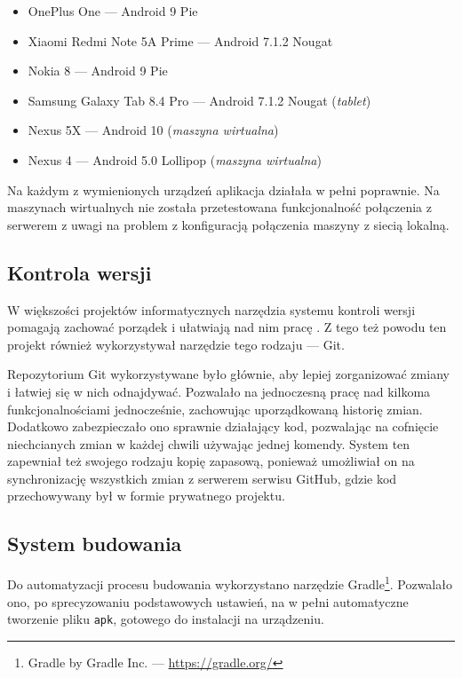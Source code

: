 \documentclass[polish,polish,a4paper,12pt]{article}
\begin{document}
	\begin{itemize}
		\item OnePlus One — Android 9 Pie
		\item Xiaomi Redmi Note 5A Prime — Android 7.1.2 Nougat
		\item Nokia 8 — Android 9 Pie
		\item Samsung Galaxy Tab 8.4 Pro — Android 7.1.2 Nougat (\textit{tablet})
		\item Nexus 5X — Android 10 (\textit{maszyna wirtualna})
		\item Nexus 4 — Android 5.0 Lollipop (\textit{maszyna wirtualna})
	\end{itemize}

	Na każdym z wymienionych urządzeń aplikacja działała w pełni poprawnie. Na maszynach wirtualnych nie została przetestowana funkcjonalność połączenia z serwerem z uwagi na problem z konfiguracją połączenia maszyny z siecią lokalną.

	\subsection{Kontrola wersji}

	W większości projektów informatycznych narzędzia systemu kontroli wersji pomagają zachować porządek i ułatwiają nad nim pracę \cite{git}. Z tego też powodu ten projekt również wykorzystywał narzędzie tego rodzaju — Git.

	Repozytorium Git wykorzystywane było głównie, aby lepiej zorganizować zmiany i łatwiej się w nich odnajdywać. Pozwalało na jednoczesną pracę nad kilkoma funkcjonalnościami jednocześnie, zachowując uporządkowaną historię zmian. Dodatkowo zabezpieczało ono sprawnie działający kod, pozwalając na cofnięcie niechcianych zmian w każdej chwili używając jednej komendy. System ten zapewniał też swojego rodzaju kopię zapasową, ponieważ umożliwiał on na synchronizację wszystkich zmian z serwerem serwisu GitHub, gdzie kod przechowywany był w formie prywatnego projektu.

	\subsection{System budowania}

	Do automatyzacji procesu budowania wykorzystano narzędzie Gradle\footnote{Gradle by Gradle Inc. — \url{https://gradle.org/}}. Pozwalało ono, po sprecyzowaniu podstawowych ustawień, na w pełni automatyczne tworzenie pliku \texttt{apk}, gotowego do instalacji na urządzeniu.
\end{document}
